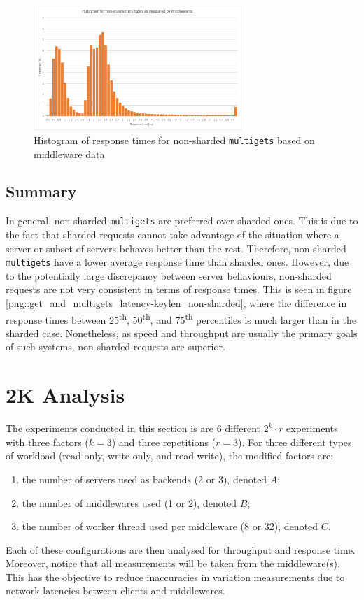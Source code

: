 \documentclass[11pt,a4paper]{article}
\begin{document}
\begin{figure}[!h]
    \centering
    \includegraphics[width=0.7\textwidth]{processing/graphics/get_and_multigets_hist_non-sharded_mws.png}
    \caption{Histogram of response times for non-sharded \texttt{multigets} based on middleware data}
    \label{png::get_and_multigets_hist_non-sharded_mws}
\end{figure}

\subsection{Summary}
In general, non-sharded \texttt{multigets} are preferred over sharded ones. This is due to the fact that sharded requests cannot take advantage of the situation where a server or subset of servers behaves better than the rest. Therefore, non-sharded \texttt{multigets} have a lower average response time than sharded ones. However, due to the potentially large discrepancy between server behaviours, non-sharded requests are not very consistent in terms of response times. This is seen in figure \ref{png::get_and_multigets_latency-keylen_non-sharded}, where the difference in response times between 25\textsuperscript{th}, 50\textsuperscript{th}, and 75\textsuperscript{th} percentiles is much larger than in the sharded case. Nonetheless, as speed and throughput are usually the primary goals of such systems, non-sharded requests are superior.

\section{2K Analysis}
The experiments conducted in this section is are 6 different $2^k\cdot r$ experiments with three factors ($k = 3$) and three repetitions ($r = 3$). For three different types of workload (read-only, write-only, and read-write), the modified factors are:
\begin{enumerate}
    \item the number of servers used as backends (2 or 3), denoted $A$;
    \item the number of middlewares used (1 or 2), denoted $B$;
    \item the number of worker thread used per middleware (8 or 32), denoted $C$.
\end{enumerate}
Each of these configurations are then analysed for throughput and response time. Moreover, notice that all measurements will be taken from the middleware(s). This has the objective to reduce inaccuracies in variation measurements due to network latencies between clients and middlewares.
\end{document}
